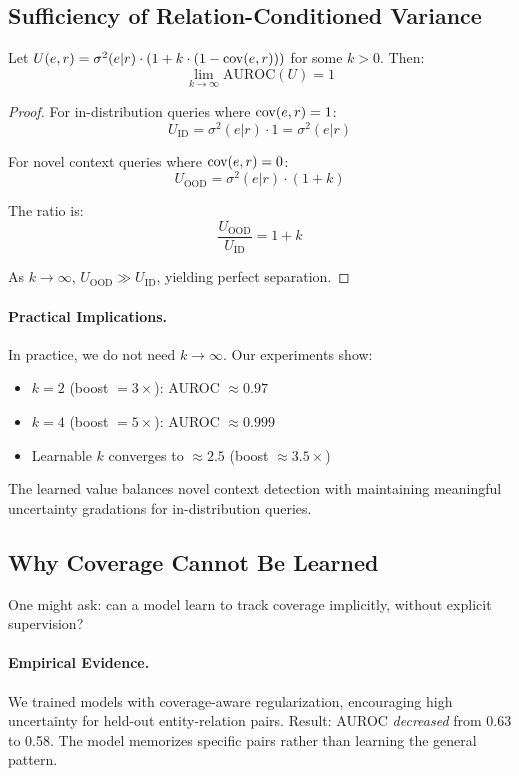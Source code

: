 \subsection{Sufficiency of Relation-Conditioned Variance}

\begin{theorem}[Sufficiency]
\label{thm:sufficiency}
Let $U(e, r) = \sigma^2(e | r) \cdot (1 + k \cdot (1 - \mathrm{cov}(e, r)))$ for some $k > 0$. Then:
\[
\lim_{k \to \infty} \text{AUROC}(U) = 1
\]
\end{theorem}

\begin{proof}
For in-distribution queries where $\mathrm{cov}(e, r) = 1$:
\[
U_\text{ID} = \sigma^2(e | r) \cdot 1 = \sigma^2(e | r)
\]

For novel context queries where $\mathrm{cov}(e, r) = 0$:
\[
U_\text{OOD} = \sigma^2(e | r) \cdot (1 + k)
\]

The ratio is:
\[
\frac{U_\text{OOD}}{U_\text{ID}} = 1 + k
\]

As $k \to \infty$, $U_\text{OOD} \gg U_\text{ID}$, yielding perfect separation.
\end{proof}

\paragraph{Practical Implications.}
In practice, we do not need $k \to \infty$. Our experiments show:
\begin{itemize}
    \item $k = 2$ (boost $= 3\times$): AUROC $\approx 0.97$
    \item $k = 4$ (boost $= 5\times$): AUROC $\approx 0.999$
    \item Learnable $k$ converges to $\approx 2.5$ (boost $\approx 3.5\times$)
\end{itemize}

The learned value balances novel context detection with maintaining meaningful uncertainty gradations for in-distribution queries.

\subsection{Why Coverage Cannot Be Learned}

One might ask: can a model learn to track coverage implicitly, without explicit supervision?

\paragraph{Empirical Evidence.}
We trained models with coverage-aware regularization, encouraging high uncertainty for held-out entity-relation pairs. Result: AUROC \emph{decreased} from 0.63 to 0.58. The model memorizes specific pairs rather than learning the general pattern.

